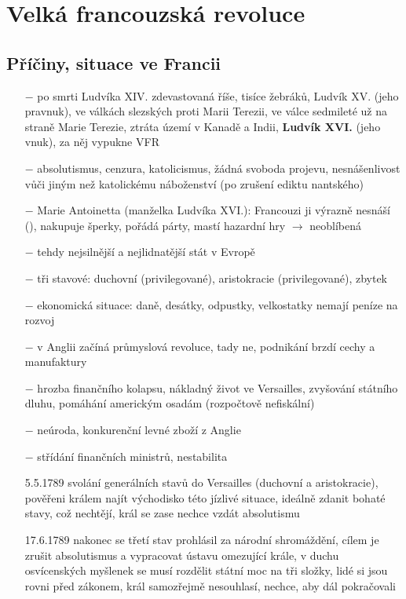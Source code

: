 \documentclass{article}
\begin{document}
\section*{Velká francouzská revoluce}

\subsection*{Příčiny, situace ve Francii}

\begin{itemize}
    \vspace{-0.5em}
    \setlength\itemsep{0.15em}
    \item[$-$] po smrti Ludvíka XIV. zdevastovaná říše, tisíce žebráků, Ludvík XV. (jeho pravnuk), ve válkách slezských proti Marii Terezii, ve válce sedmileté už na straně Marie Terezie, ztráta území v Kanadě a Indii, \textbf{Ludvík XVI.}  (jeho vnuk), za něj vypukne VFR
    \item[$-$] absolutismus, cenzura, katolicismus, žádná svoboda projevu, nesnášenlivost vůči jiným než katolickému náboženství (po zrušení ediktu nantského)
    \item[$-$] Marie Antoinetta (manželka Ludvíka XVI.): Francouzi ji výrazně nesnáší (), nakupuje šperky, pořádá párty, mastí hazardní hry $\rightarrow$ neoblíbená
    \item[$-$] tehdy nejsilnější a nejlidnatější stát v Evropě
    \item[$-$] tři stavové: duchovní (privilegované), aristokracie (privilegované), zbytek
    \item[$-$] ekonomická situace: daně, desátky, odpustky, velkostatky nemají peníze na rozvoj
    \item[$-$] v Anglii začíná průmyslová revoluce, tady ne, podnikání brzdí cechy a manufaktury
    \item[$-$] hrozba finančního kolapsu, nákladný život ve Versailles, zvyšování státního dluhu, pomáhání americkým osadám (rozpočtově nefiskální)
    \item[$-$] neúroda, konkurenční levné zboží z Anglie
    \item[$-$] střídání finančních ministrů, nestabilita
    \item[5.5.1789] svolání generálních stavů do Versailles (duchovní a aristokracie), pověřeni králem najít východisko této jízlivé situace, ideálně zdanit bohaté stavy, což nechtějí, král se zase nechce vzdát absolutismu
    \item[17.6.1789] nakonec se třetí stav prohlásil za národní shromáždění, cílem je zrušit absolutismus a vypracovat ústavu omezující krále, v duchu osvícenských myšlenek se musí rozdělit státní moc na tři složky, lidé si jsou rovni před zákonem, král samozřejmě nesouhlasí, nechce, aby dál pokračovali

\end{itemize}
\end{document}
